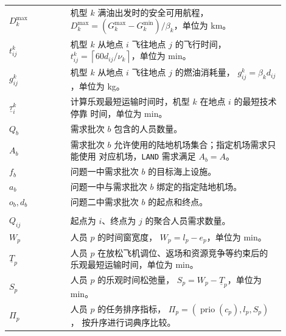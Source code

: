 \documentclass[UTF8,a4paper,zihao=5]{ctexart}
\begin{document}
\begin{longtable}{
    >{\centering\arraybackslash}p{0.20\linewidth}
    p{0.70\linewidth}
}
    $D_k^{\max}$
    & 机型 $k$ 满油出发时的安全可用航程，
    $D_k^{\max}=(G_k^{\max}-G_k^{\min})/\beta_k$，单位为 km。 \\

    $t_{ij}^{k}$
    & 机型 $k$ 从地点 $i$ 飞往地点 $j$ 的飞行时间，
    $t_{ij}^{k}=\left\lceil 60d_{ij}/\nu_k\right\rceil$，单位为 min。 \\

    $g_{ij}^{k}$
    & 机型 $k$ 从地点 $i$ 飞往地点 $j$ 的燃油消耗量，
    $g_{ij}^{k}=\beta_kd_{ij}$，单位为 kg。 \\

    $\underline{\tau}_i^k$
    & 计算乐观最短运输时间时，机型 $k$ 在地点 $i$ 的最短技术停靠
    时间，单位为 min。 \\

    $Q_b$
    & 需求批次 $b$ 包含的人员数量。 \\

    $A_b$
    & 需求批次 $b$ 允许使用的陆地机场集合；指定机场需求只能使用
    对应机场，\texttt{LAND} 需求满足 $A_b=A$。 \\

    $f_b$
    & 问题一中需求批次 $b$ 的目标海上设施。 \\

    $a_b$
    & 问题一中与需求批次 $b$ 绑定的指定陆地机场。 \\

    $o_b,d_b$
    & 问题二中需求批次 $b$ 的起点和终点。 \\

    \midrule
    \multicolumn{2}{l}{\textbf{需求聚合与时间窗指标}} \\[2pt]

    $Q_{ij}$
    & 起点为 $i$、终点为 $j$ 的聚合人员需求数量。 \\

    $W_p$
    & 人员 $p$ 的时间窗宽度，
    $W_p=l_p-e_p$，单位为 min。 \\

    $\underline{T}_p$
    & 人员 $p$ 在放松飞机调位、返场和资源竞争等约束后的
    乐观最短运输时间，单位为 min。 \\

    $S_p$
    & 人员 $p$ 的乐观时间松弛量，
    $S_p=W_p-\underline{T}_p$，单位为 min。 \\

    $\Pi_p$
    & 人员 $p$ 的任务排序指标，
    $\Pi_p=(\operatorname{prio}(c_p),l_p,S_p)$，
    按升序进行词典序比较。 \\


\end{longtable}
\end{document}
